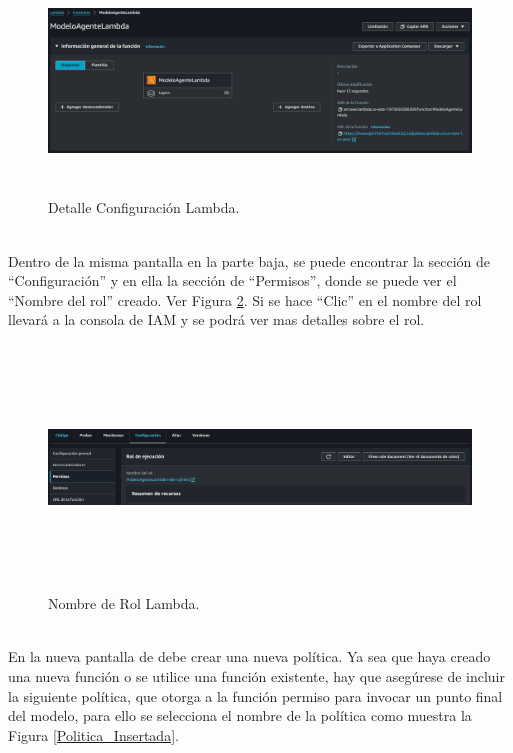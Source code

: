 \documentclass[a4paper,10pt, oneside, titlepage]{article}
\begin{document}
	\begin{figure}[!h]
		\centering
		\includegraphics[width = 1\linewidth, height = 6cm]{Modelo_Agente_Lambda.png}
		\caption{Detalle Configuración Lambda.}
		\label{Modelo_Agente_Lambda}
	\end{figure} \\
	\indent Dentro de la misma pantalla en la parte baja, se puede encontrar la sección de ``Configuración'' y en ella la sección de ``Permisos'', donde se puede ver el ``Nombre del rol'' creado. Ver Figura \ref{Nombre_Rol_Lambda}. Si se hace ``Clic'' en el nombre del rol llevará a la consola de IAM y se podrá ver mas detalles sobre el rol.
	\begin{figure}[!h]
		\centering
		\includegraphics[width = 1\linewidth, height = 6.5cm]{Nombre_Rol_Lambda.png}
		\caption{Nombre de Rol Lambda.}
		\label{Nombre_Rol_Lambda}
	\end{figure} \\
	\indent En la nueva pantalla de debe crear una nueva política. Ya sea que haya creado una nueva función o se utilice una función existente, hay que asegúrese de incluir la siguiente política, que otorga a la función permiso para invocar un punto final del modelo, para ello se selecciona el nombre de la política como muestra la Figura \ref{Politica_Insertada}.
\end{document}
